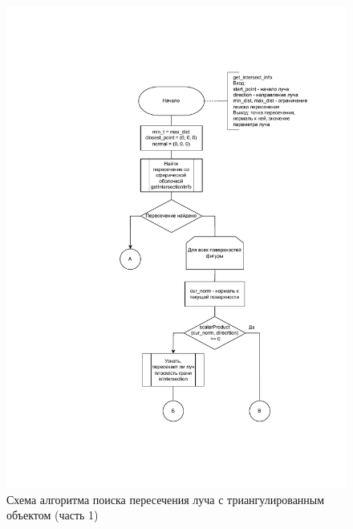 \begin{figure}[H]
	\begin{center}
		\includegraphics[width=\linewidth]{img/tr_intersection_1.pdf}
	\end{center}
	\captionsetup{justification=centering}
	\caption{Схема алгоритма поиска пересечения луча с триангулированным объектом (часть 1)}
	\label{img:tr_intersection_1}
\end{figure}

